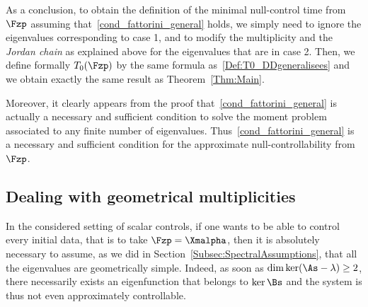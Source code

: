 As a conclusion, to obtain the definition of the minimal null-control time from $\Fzp$ assuming that~\eqref{cond_fattorini_general} holds, we simply need to ignore the eigenvalues corresponding to case 1, and to modify the multiplicity and the {\em Jordan chain} as explained above for the eigenvalues that are in case 2. Then, we define formally $T_0(\Fzp)$ by the same formula as~\eqref{Def:T0_DDgeneralisees} and we obtain exactly the same result as Theorem~\ref{Thm:Main}.

Moreover, it clearly appears from the proof that~\eqref{cond_fattorini_general} is actually a necessary and sufficient condition to solve the moment problem associated to any finite number of eigenvalues. Thus~\eqref{cond_fattorini_general} is a necessary and sufficient condition for the approximate null-controllability from $\Fzp$.



\subsection{Dealing with geometrical multiplicities} \label{Subsec:MultipliciteGeo}

In the considered setting of scalar controls, if one wants to be able to control every initial data, that is to take $\Fzp=\Xmalpha$, then it is absolutely necessary to assume, as we did in Section~\ref{Subsec:SpectralAssumptions}, that all the eigenvalues are geometrically simple. Indeed, as soon as $\dim \ker(\As-\lambda)\geq 2$, there necessarily exists an eigenfunction that belongs to $\ker \Bs$ and the system is thus not even approximately controllable.


